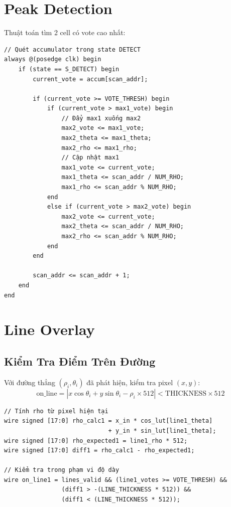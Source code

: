 \documentclass[12pt,a4paper]{report}
\begin{document}
\section{Peak Detection}

Thuật toán tìm 2 cell có vote cao nhất:

\begin{lstlisting}[caption={Peak detection logic}, label={lst:peak}]
// Quét accumulator trong state DETECT
always @(posedge clk) begin
    if (state == S_DETECT) begin
        current_vote = accum[scan_addr];
        
        if (current_vote >= VOTE_THRESH) begin
            if (current_vote > max1_vote) begin
                // Đẩy max1 xuống max2
                max2_vote <= max1_vote;
                max2_theta <= max1_theta;
                max2_rho <= max1_rho;
                // Cập nhật max1
                max1_vote <= current_vote;
                max1_theta <= scan_addr / NUM_RHO;
                max1_rho <= scan_addr % NUM_RHO;
            end
            else if (current_vote > max2_vote) begin
                max2_vote <= current_vote;
                max2_theta <= scan_addr / NUM_RHO;
                max2_rho <= scan_addr % NUM_RHO;
            end
        end
        
        scan_addr <= scan_addr + 1;
    end
end
\end{lstlisting}

\section{Line Overlay}

\subsection{Kiểm Tra Điểm Trên Đường}
Với đường thẳng $(\rho_i, \theta_i)$ đã phát hiện, kiểm tra pixel $(x, y)$:
\begin{equation}
    \text{on\_line} = |x \cos\theta_i + y \sin\theta_i - \rho_i \times 512| < \text{THICKNESS} \times 512
\end{equation}

\begin{lstlisting}[caption={Line check logic}, label={lst:linecheck}]
// Tính rho từ pixel hiện tại
wire signed [17:0] rho_calc1 = x_in * cos_lut[line1_theta] 
                             + y_in * sin_lut[line1_theta];
wire signed [17:0] rho_expected1 = line1_rho * 512;
wire signed [17:0] diff1 = rho_calc1 - rho_expected1;

// Kiểm tra trong phạm vi độ dày
wire on_line1 = lines_valid && (line1_votes >= VOTE_THRESH) &&
                (diff1 > -(LINE_THICKNESS * 512)) && 
                (diff1 < (LINE_THICKNESS * 512));
\end{lstlisting}
\end{document}

